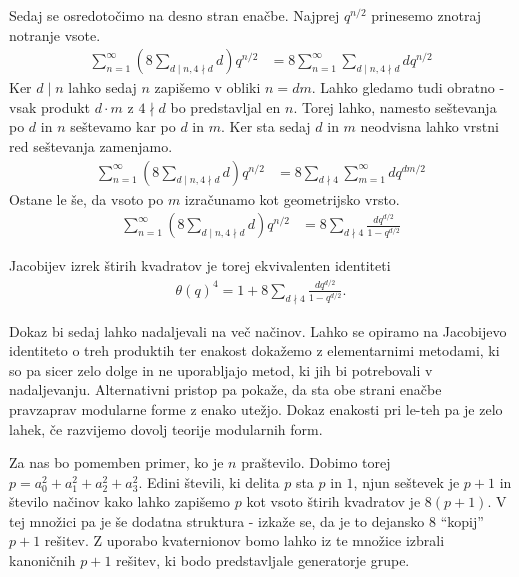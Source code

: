\begin{dokaz}
    Sedaj se osredotočimo na desno stran enačbe. Najprej \(q^{n/2}\) prinesemo znotraj notranje vsote.
    \begin{align*}
        \sum_{n=1}^\infty \left(8\sum_{d\mid n, 4\nmid d} d \right) q^{n/2} & =  8\sum_{n=1}^\infty \sum_{d\mid n, 4\nmid d} d  q^{n/2}
    \end{align*}
    Ker \(d \mid n\) lahko sedaj \(n\) zapišemo v obliki \(n = dm\). Lahko gledamo tudi obratno - vsak produkt \(d\cdot m\) z \(4\nmid d\) bo predstavljal en \(n\). Torej lahko, namesto seštevanja po \(d\) in \(n\) seštevamo kar po \(d\) in \(m\). Ker sta sedaj \(d\) in \(m\) neodvisna lahko vrstni red seštevanja zamenjamo.
    \begin{align*}
        \sum_{n=1}^\infty \left(8\sum_{d\mid n, 4\nmid d} d \right) q^{n/2} & =  8\sum_{d\nmid 4} \sum_{m = 1}^\infty d  q^{dm/2}
    \end{align*}
    Ostane le še, da vsoto po \(m\) izračunamo kot geometrijsko vrsto.
    \begin{align*}
        \sum_{n=1}^\infty \left(8\sum_{d\mid n, 4\nmid d} d \right) q^{n/2} & = 8\sum_{d\nmid 4} \frac{d q^{d/2}}{1-q^{d/2}}
    \end{align*}

    Jacobijev izrek štirih kvadratov je torej ekvivalenten identiteti
    \begin{align*}
        \theta(q)^4 = 1+8\sum_{d\nmid 4} \frac{d q^{d/2}}{1-q^{d/2}}.
    \end{align*}

    Dokaz bi sedaj lahko nadaljevali na več načinov. Lahko se opiramo na Jacobijevo identiteto o treh produktih ter enakost dokažemo z elementarnimi metodami, ki so pa sicer zelo dolge in ne uporabljajo metod, ki jih bi potrebovali v nadaljevanju. Alternativni pristop pa pokaže, da sta obe strani enačbe pravzaprav modularne forme z enako utežjo. Dokaz enakosti pri le-teh pa je zelo lahek, če razvijemo dovolj teorije modularnih form.
\end{dokaz}

Za nas bo pomemben primer, ko je \(n\) praštevilo. Dobimo torej \(p=a_0^2 + a_1^2 + a_2^2 + a_3^2\). Edini števili, ki delita \(p\) sta \(p\) in \(1\), njun seštevek je \(p+1\) in število načinov kako lahko zapišemo \(p\) kot vsoto štirih kvadratov je \(8(p+1)\). V tej množici pa je še dodatna struktura - izkaže se, da je to dejansko \(8\) ``kopij'' \(p+1\) rešitev. Z uporabo kvaternionov bomo lahko iz te množice izbrali kanoničnih \(p+1\) rešitev, ki bodo predstavljale generatorje grupe.

